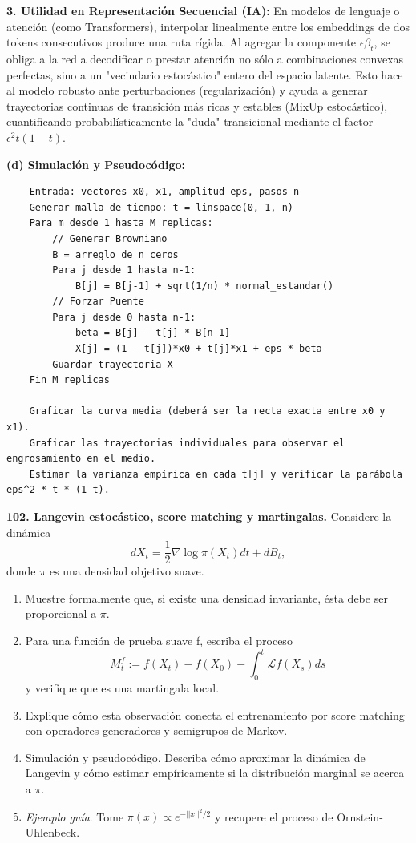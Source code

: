 \documentclass[11pt, letterpaper]{article}
\begin{document}
\begin{solucion}
    \textbf{3. Utilidad en Representación Secuencial (IA):}
    En modelos de lenguaje o atención (como Transformers), interpolar linealmente entre los embeddings de dos tokens consecutivos produce una ruta rígida. Al agregar la componente $\epsilon \beta_t$, se obliga a la red a decodificar o prestar atención no sólo a combinaciones convexas perfectas, sino a un "vecindario estocástico" entero del espacio latente. Esto hace al modelo robusto ante perturbaciones (regularización) y ayuda a generar trayectorias continuas de transición más ricas y estables (MixUp estocástico), cuantificando probabilísticamente la "duda" transicional mediante el factor $\epsilon^2 t(1-t)$.

    \textbf{(d) Simulación y Pseudocódigo:}
    \begin{verbatim}
    Entrada: vectores x0, x1, amplitud eps, pasos n
    Generar malla de tiempo: t = linspace(0, 1, n)
    Para m desde 1 hasta M_replicas:
        // Generar Browniano
        B = arreglo de n ceros
        Para j desde 1 hasta n-1:
            B[j] = B[j-1] + sqrt(1/n) * normal_estandar()
        // Forzar Puente
        Para j desde 0 hasta n-1:
            beta = B[j] - t[j] * B[n-1]
            X[j] = (1 - t[j])*x0 + t[j]*x1 + eps * beta
        Guardar trayectoria X
    Fin M_replicas
    
    Graficar la curva media (deberá ser la recta exacta entre x0 y x1).
    Graficar las trayectorias individuales para observar el engrosamiento en el medio.
    Estimar la varianza empírica en cada t[j] y verificar la parábola eps^2 * t * (1-t).
    \end{verbatim}
\end{solucion}

\newpage

\begin{ejercicio}
    \textbf{102. Langevin estocástico, score matching y martingalas.} Considere la dinámica
    \[ dX_{t}=\frac{1}{2}\nabla \log \pi(X_{t})dt+dB_{t}, \]
    donde $\pi$ es una densidad objetivo suave.
    \begin{enumerate}
        \item Muestre formalmente que, si existe una densidad invariante, ésta debe ser proporcional a $\pi$.
        \item Para una función de prueba suave f, escriba el proceso
        \[ M_{t}^{f}:=f(X_{t})-f(X_{0})-\int_{0}^{t}\mathcal{L}f(X_{s})ds \]
        y verifique que es una martingala local.
        \item Explique cómo esta observación conecta el entrenamiento por score matching con operadores generadores y semigrupos de Markov.
        \item Simulación y pseudocódigo. Describa cómo aproximar la dinámica de Langevin y cómo estimar empíricamente si la distribución marginal se acerca a $\pi$.
        \item \textit{Ejemplo guía}. Tome $\pi(x)\propto e^{-||x||^{2}/2}$ y recupere el proceso de Ornstein-Uhlenbeck.
    \end{enumerate}
\end{ejercicio}
\end{document}
